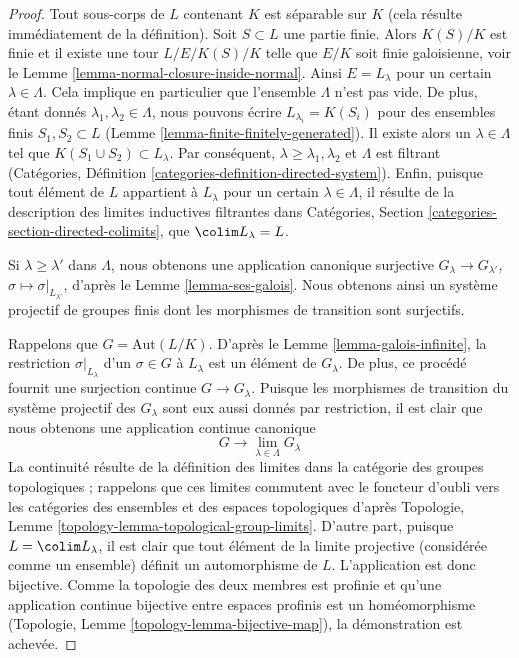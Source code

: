 \begin{proof}
Tout sous-corps de $L$ contenant $K$ est séparable sur $K$
(cela résulte immédiatement de la définition). Soit $S \subset L$
une partie finie. Alors $K(S)/K$ est finie et il existe
une tour $L/E/K(S)/K$ telle que $E/K$ soit finie galoisienne, voir le
Lemme \ref{lemma-normal-closure-inside-normal}.
Ainsi $E = L_\lambda$ pour un certain $\lambda \in \Lambda$.
Cela implique en particulier que l'ensemble $\Lambda$ n'est pas vide.
De plus, étant donnés $\lambda_1, \lambda_2 \in \Lambda$, nous pouvons
écrire $L_{\lambda_i} = K(S_i)$ pour des ensembles finis
$S_1, S_2 \subset L$ (Lemme \ref{lemma-finite-finitely-generated}).
Il existe alors un $\lambda \in \Lambda$ tel que
$K(S_1 \cup S_2) \subset L_\lambda$. Par conséquent,
$\lambda \geq \lambda_1, \lambda_2$ et
$\Lambda$ est filtrant (Catégories, Définition
\ref{categories-definition-directed-system}).
Enfin, puisque tout élément de $L$ appartient à
$L_\lambda$ pour un certain $\lambda \in \Lambda$, il résulte
de la description des limites inductives filtrantes dans
Catégories, Section \ref{categories-section-directed-colimits},
que $\colim L_\lambda = L$.

\medskip\noindent
Si $\lambda \geq \lambda'$ dans $\Lambda$, nous obtenons une
application canonique surjective $G_\lambda \to G_{\lambda'}$,
$\sigma \mapsto \sigma|_{L_{\lambda'}}$,
d'après le Lemme \ref{lemma-ses-galois}. Nous obtenons ainsi un système
projectif de groupes finis dont les morphismes de transition sont surjectifs.

\medskip\noindent
Rappelons que $G = \text{Aut}(L/K)$. D'après le Lemme \ref{lemma-galois-infinite},
la restriction $\sigma|_{L_\lambda}$ d'un $\sigma \in G$ à $L_\lambda$
est un élément de $G_\lambda$. De plus, ce procédé fournit une surjection
continue $G \to G_\lambda$. Puisque les morphismes de transition
du système projectif des $G_\lambda$ sont eux aussi donnés par restriction,
il est clair que nous obtenons une application continue canonique
$$
G \longrightarrow \lim_{\lambda \in \Lambda} G_\lambda
$$
La continuité résulte de la définition des limites dans la catégorie des groupes
topologiques ; rappelons que ces limites commutent avec le foncteur d'oubli
vers les catégories des ensembles et des espaces topologiques d'après
Topologie, Lemme \ref{topology-lemma-topological-group-limits}.
D'autre part, puisque $L = \colim L_\lambda$, il est clair
que tout élément de la limite projective (considérée comme un ensemble) définit un
automorphisme de $L$. L'application est donc bijective. Comme la topologie
des deux membres est profinie et qu'une application continue bijective
entre espaces profinis est un homéomorphisme
(Topologie, Lemme \ref{topology-lemma-bijective-map}), la démonstration est achevée.
\end{proof}

